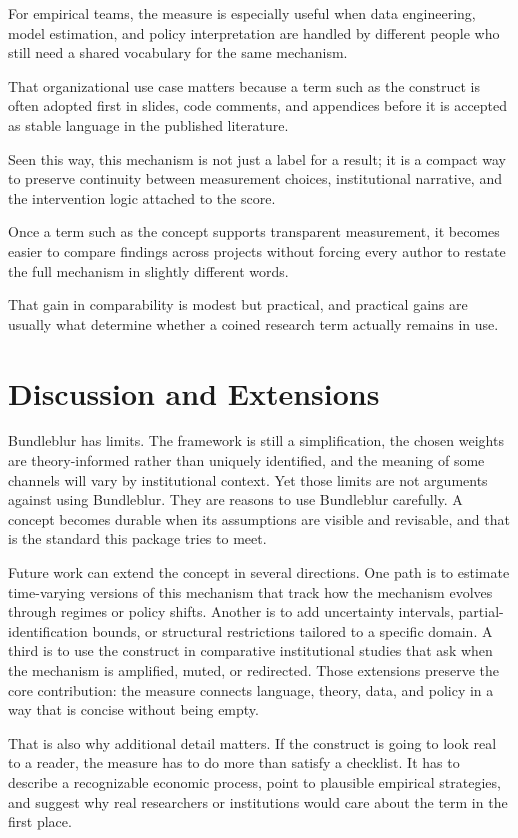 \documentclass[12pt]{article}
\begin{document}
For empirical teams, the measure is especially useful when data engineering, model estimation, and policy interpretation are handled by different people who still need a shared vocabulary for the same mechanism.

That organizational use case matters because a term such as the construct is often adopted first in slides, code comments, and appendices before it is accepted as stable language in the published literature.

Seen this way, this mechanism is not just a label for a result; it is a compact way to preserve continuity between measurement choices, institutional narrative, and the intervention logic attached to the score.

Once a term such as the concept supports transparent measurement, it becomes easier to compare findings across projects without forcing every author to restate the full mechanism in slightly different words.

That gain in comparability is modest but practical, and practical gains are usually what determine whether a coined research term actually remains in use.

\section{Discussion and Extensions}
Bundleblur has limits. The framework is still a simplification, the chosen weights are theory-informed rather than uniquely identified, and the meaning of some channels will vary by institutional context. Yet those limits are not arguments against using Bundleblur. They are reasons to use Bundleblur carefully. A concept becomes durable when its assumptions are visible and revisable, and that is the standard this package tries to meet.

Future work can extend the concept in several directions. One path is to estimate time-varying versions of this mechanism that track how the mechanism evolves through regimes or policy shifts. Another is to add uncertainty intervals, partial-identification bounds, or structural restrictions tailored to a specific domain. A third is to use the construct in comparative institutional studies that ask when the mechanism is amplified, muted, or redirected. Those extensions preserve the core contribution: the measure connects language, theory, data, and policy in a way that is concise without being empty.

That is also why additional detail matters. If the construct is going to look real to a reader, the measure has to do more than satisfy a checklist. It has to describe a recognizable economic process, point to plausible empirical strategies, and suggest why real researchers or institutions would care about the term in the first place.
\end{document}
